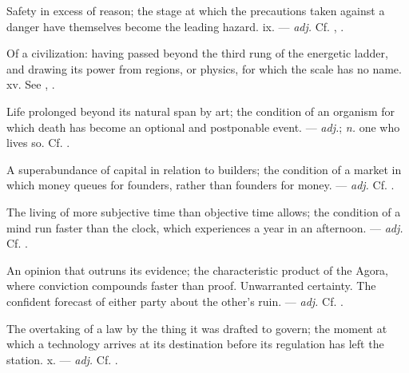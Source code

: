  Safety in excess of reason; the stage at which the precautions taken against a danger have themselves become the leading hazard.   ix. ---  \textit{adj.} Cf. , .

 Of a civilization: having passed beyond the third rung of the energetic ladder, and drawing its power from regions, or physics, for which the scale has no name.   xv. See , .

 Life prolonged beyond its natural span by art; the condition of an organism for which death has become an optional and postponable event. ---  \textit{adj.};  \textit{n.} one who lives so. Cf. .

 A superabundance of capital in relation to builders; the condition of a market in which money queues for founders, rather than founders for money.   ---  \textit{adj.} Cf. .

 The living of more subjective time than objective time allows; the condition of a mind run faster than the clock, which experiences a year in an afternoon.  ---  \textit{adj.} Cf. .

 An opinion that outruns its evidence; the characteristic product of the Agora, where conviction compounds faster than proof.   Unwarranted certainty.   The confident forecast of either party about the other's ruin. ---  \textit{adj.} Cf. .

 The overtaking of a law by the thing it was drafted to govern; the moment at which a technology arrives at its destination before its regulation has left the station.   x. ---  \textit{adj.} Cf. .

